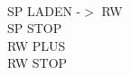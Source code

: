 \documentclass[a4paper,36pt,extrafontsizes]{memoir}
\begin{document}
~\\
SP LADEN -$>$ RW\\
SP STOP\\
RW PLUS\\
RW STOP\\
\end{document}
